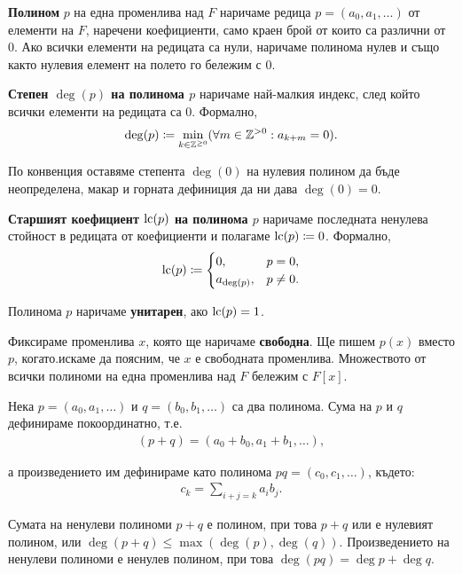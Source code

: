\documentclass[numbers=endperiod, bibliography=totocnumbered]{scrartcl}
\begin{document}
\begin{definition}
  \textbf{Полином} \( p \) на една променлива над \( F \) наричаме редица \( p = (a_0, a_1, \ldots) \) от елементи на \( F \), наречени коефициенти, само краен брой от които са различни от \( 0 \). Ако всички елементи на редицата са нули, наричаме полинома нулев и също както нулевия елемент на полето го бележим с \( 0 \).

  \textbf{Степен \( \deg(p) \) на полинома \( p \)} наричаме най-малкия индекс, след който всички елементи на редицата са \( 0 \). Формално,
  \begin{align*}
    \deg(p) \coloneqq \min_{k \in \mathbb{Z}^{\geq 0}} (\forall m \in \mathbb{Z}^{> 0} : a_{k + m} = 0).
  \end{align*}

  По конвенция оставяме степента \( \deg(0) \) на нулевия полином да бъде неопределена, макар и горната дефиниция да ни дава \( \deg(0) = 0 \).

  \textbf{Старшият коефициент \( \operatorname{lc}(p) \) на полинома \( p \)} наричаме последната ненулева стойност в редицата от коефициенти и полагаме \( \operatorname{lc}(p) \coloneqq 0 \). Формално,
  \begin{align*}
    \operatorname{lc}(p) \coloneqq
    \begin{cases}
      0, &p = 0, \\
      a_{\deg(p)}, &p \neq 0.
    \end{cases}
  \end{align*}

  Полинома \( p \) наричаме \textbf{унитарен}, ако \( \operatorname{lc}(p) = 1 \).
\end{definition}

Фиксираме променлива \( x \), която ще наричаме \textbf{свободна}.
Ще пишем \( p(x) \) вместо \( p \), когато.искаме да поясним, че \( x \) е свободната променлива. Множеството от всички полиноми на една променлива над \( F \) бележим с \( F[x] \).

Нека \( p = (a_0, a_1, \ldots) \) и \( q = (b_0, b_1, \ldots) \) са два полинома. Сума на \( p \) и \( q \) дефинираме покоординатно, т.е.
\begin{align*}
  (p + q) = (a_0 + b_0, a_1 + b_1, \ldots),
\end{align*}

а произведението им дефинираме като полинома \( pq = (c_0, c_1, \ldots) \), където:
\begin{align*}
  c_k = \sum_{i+j=k} a_i b_j.
\end{align*}

Сумата на ненулеви полиноми \( p + q \) е полином, при това \( p + q \) или е нулевият полином, или \( \deg(p + q) \leq \max(\deg(p), \deg(q)) \). Произведението на ненулеви полиноми е ненулев полином, при това \( \deg(pq) = \deg p + \deg q \).
\end{document}
